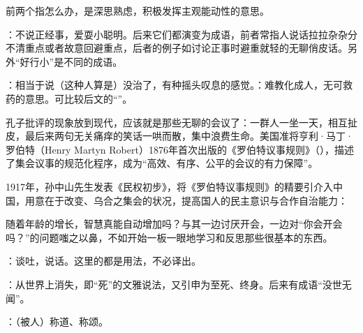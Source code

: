 {
\item 前两个指怎么办，是深思熟虑，积极发挥主观能动性的意思。
}
{}


{
\item {}：不说正经事，爱耍小聪明。后来它们都演变为成语，前者常指人说话拉拉杂杂分不清重点或者故意回避重点，后者的例子如讨论正事时避重就轻的无聊俏皮话。另外“好行小”是不同的成语。
\item {}：相当于说（这种人算是）没治了，有种摇头叹息的感觉。：难教化成人，无可救药的意思。可比较后文的“”。
}
{
孔子批评的现象放到现代，应该就是那些无聊的会议了：一群人一坐一天，相互扯皮，最后来两句无关痛痒的笑话一哄而散，集中浪费生命。美国准将亨利·马丁·罗伯特（Henry Martyn Robert）1876年首次出版的《罗伯特议事规则》（\emph{}），描述了集会议事的规范化程序，成为“高效、有序、公平的会议的有力保障”。

1917年，孙中山先生发表《民权初步》，将《罗伯特议事规则》的精要引介入中国，用意在于改变、乌合之集会的状况，提高国人的民主意识与合作自治能力：

随着年龄的增长，智慧真能自动增加吗？与其一边讨厌开会，一边对“你会开会吗？”的问题嗤之以鼻，不如开始一板一眼地学习和反思那些很基本的东西。
}


{
\item {}：谈吐，说话。这里的都是用法，不必译出。
}
{}


{
}
{}


{
\item {}：从世界上消失，即“死”的文雅说法，又引申为至死、终身。后来有成语“没世无闻”。
\item {}：（被人）称道、称颂。
}
{}


